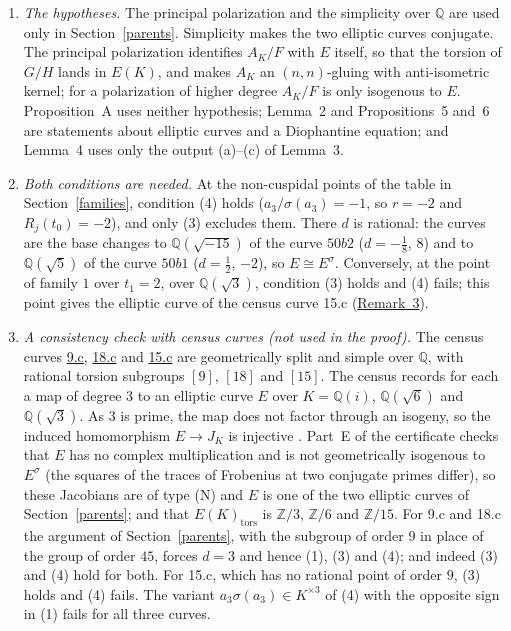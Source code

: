 \documentclass[11pt]{article}
\newcommand{\Q}{\mathbb Q}
\newcommand{\Z}{\mathbb Z}
\begin{document}
\begin{enumerate}
\item\label{rem-hyp} \emph{The hypotheses.} The principal polarization and the simplicity over \(\Q\)
are used only in Section~\ref{parents}. Simplicity makes the two elliptic curves conjugate. The
principal polarization identifies \(A_K/F\) with \(E\) itself, so that the torsion of \(G/H\) lands in
\(E(K)\), and makes \(A_K\) an \((n,n)\)-gluing with anti-isometric kernel; for a polarization of
higher degree \(A_K/F\) is only isogenous to \(E\). Proposition~A uses neither hypothesis;
Lemma~2 and Propositions~5 and~6 are statements about elliptic curves and a Diophantine equation;
and Lemma~4 uses only the output (a)--(c) of Lemma~3.

\item\label{rem-both} \emph{Both conditions are needed.} At the non-cuspidal points of the table in
Section~\ref{families}, condition (4) holds (\(a_3/\sigma(a_3)=-1\), so \(r=-2\) and
\(R_j(t_0)=-2\)), and only (3) excludes them. There \(d\) is rational: the curves are the base changes
to \(\Q(\sqrt{-15})\) of the curve \(50b2\) (\(d=-\tfrac18\), \(8\)) and to \(\Q(\sqrt5)\) of the curve
\(50b1\) (\(d=\tfrac12\), \(-2\)), so \(E\cong E^\sigma\). Conversely, at the point of family \(1\)
over \(t_1=2\), over \(\Q(\sqrt3)\), condition (3) holds and (4) fails; this point gives the elliptic
curve of the census curve 15.c (\hyperref[rem-census]{Remark~3}).

\item\label{rem-census} \emph{A consistency check with census curves (not used in the proof).} The
census curves \href{https://genus-2-torsion.github.io/curve.html?id=9.c}{9.c},
\href{https://genus-2-torsion.github.io/curve.html?id=18.c}{18.c} and
\href{https://genus-2-torsion.github.io/curve.html?id=15.c}{15.c} are geometrically split and simple
over \(\Q\), with rational torsion subgroups \([9]\), \([18]\) and \([15]\). The census records for each
a map of degree \(3\) to an elliptic curve \(E\) over \(K=\Q(i)\), \(\Q(\sqrt6)\) and \(\Q(\sqrt3)\).
As \(3\) is prime, the map does not factor through an isogeny, so the induced homomorphism
\(E\to J_K\) is injective \cite[Proposition~11.4.3]{BL}. Part~E of the certificate checks that \(E\)
has no complex multiplication and is not geometrically isogenous to \(E^\sigma\) (the squares of the
traces of Frobenius at two conjugate primes differ), so these Jacobians are of type (N) and \(E\) is one
of the two elliptic curves of Section~\ref{parents}; and that \(E(K)_{\mathrm{tors}}\) is \(\Z/3\),
\(\Z/6\) and \(\Z/15\). For 9.c and
18.c the argument of Section~\ref{parents}, with the subgroup of order \(9\) in place of the group of
order \(45\), forces \(d=3\) and hence (1), (3) and (4); and indeed (3) and (4) hold for both. For
15.c, which has no rational point of order \(9\), (3) holds and (4) fails. The variant
\(a_3\sigma(a_3)\in K^{\times3}\) of (4) with the opposite sign in (1) fails for all three curves.


\end{enumerate}
\end{document}
